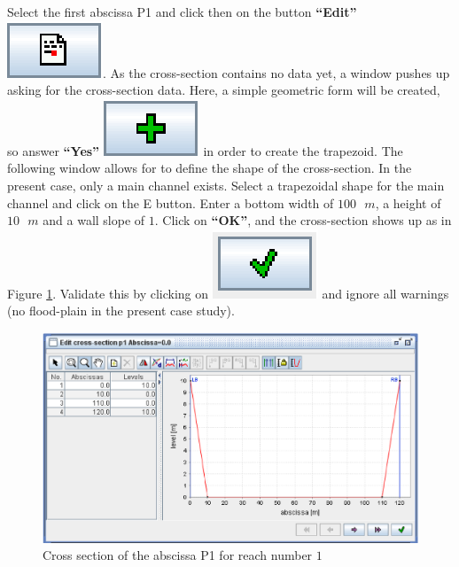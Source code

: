 \documentclass[a4paper,12pt]{article}
\begin{document}
\vspace{0.5cm}

Select the first abscissa P1 and click then on the button \textbf{{}``Edit''}
\includegraphics[scale=0.6]{edit}.
As the cross-section contains no data yet, a window pushes up asking
for the cross-section data. Here, a simple geometric form will be
created, so answer \textbf{{}``Yes''} \includegraphics[scale=0.6]{plus}
in order to create the trapezoid. The following window allows for
to define the shape of the cross-section. In the present case, only
a main channel exists. Select a trapezoidal shape for the main channel
and click on the E button. Enter a bottom width of $100\mbox{ }m$, a height
of $10\mbox{ }m$ and a wall slope of $1$. Click on \textbf{{}``OK''}, and the
cross-section shows up as in Figure \ref{fig:CS_P1}. Validate this
by clicking on \includegraphics[scale=0.6]{valid}
and ignore all warnings (no flood-plain in the present case study).

\newpage

\begin{figure}[h]
  \begin{center}
  \includegraphics[scale=0.5]{CS_R1_P1}
  \caption{Cross section of the abscissa P1 for reach number $1$}
  \label{fig:CS_P1}
  \end{center}
\end{figure}
\end{document}
